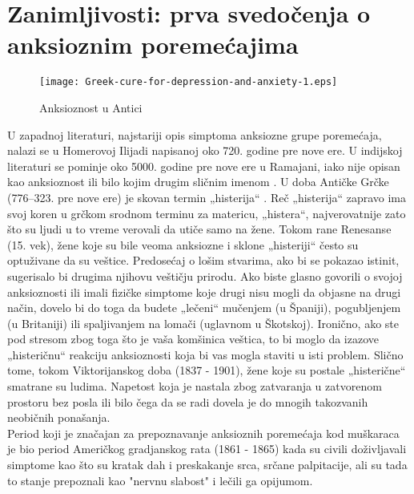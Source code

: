 \documentclass[a4paper]{article}
\begin{document}
            \section{Zanimljivosti: prva svedočenja o anksioznim poremećajima}
		\label{sec:podnaslov4}
		
	
  			
            \begin{figure}[h]
            \caption{ Anksioznost u Antici }
            \centering
            \texttt{[image: Greek-cure-for-depression-and-anxiety-1.eps]}
            \end{figure}
              U zapadnoj literaturi, najstariji opis simptoma anksiozne grupe poremećaja, nalazi se u Homerovoj Ilijadi napisanoj oko 720. godine pre nove ere. U indijskoj literaturi se pominje oko 5000. godine pre nove ere u Ramajani, iako nije opisan kao anksioznost ili bilo kojim drugim sličnim imenom \cite{sesta}.
            U doba Antičke Grčke (776–323. pre nove ere) je skovan termin „histerija“ \cite{sedma}. Reč „histerija“ zapravo ima svoj koren u grčkom srodnom terminu za matericu, „histera“, najverovatnije zato što su ljudi u to vreme verovali da utiče samo na žene. Tokom rane Renesanse (15. vek), žene koje su bile veoma anksiozne i sklone „histeriji“ često su optuživane da su veštice. Predosećaj o lošim stvarima, ako bi se pokazao istinit, sugerisalo bi drugima njihovu veštičju prirodu. Ako biste glasno govorili o svojoj anksioznosti ili imali fizičke simptome koje drugi nisu mogli da objasne na drugi način, dovelo bi do toga da budete „lečeni“ mučenjem (u Španiji), pogubljenjem (u Britaniji) ili spaljivanjem na lomači (uglavnom u Škotskoj). Ironično, ako ste pod stresom zbog toga što je vaša komšinica veštica, to bi moglo da izazove „histeričnu“ reakciju anksioznosti koja bi vas mogla staviti u isti problem. Slično tome, tokom Viktorijanskog doba (1837 - 1901), žene koje su postale „histerične“ smatrane su ludima. Napetost koja je nastala zbog zatvaranja u zatvorenom prostoru bez posla ili bilo čega da se radi dovela je do mnogih takozvanih neobičnih ponašanja. \\
      
             Period koji je značajan za prepoznavanje anksioznih poremećaja kod muškaraca je bio period Američkog gradjanskog rata (1861 - 1865) kada su civili doživljavali simptome kao što su kratak dah i preskakanje srca, srčane palpitacije, ali su tada to stanje prepoznali kao "nervnu slabost" i lečili ga opijumom.  \\
             
\end{document}
